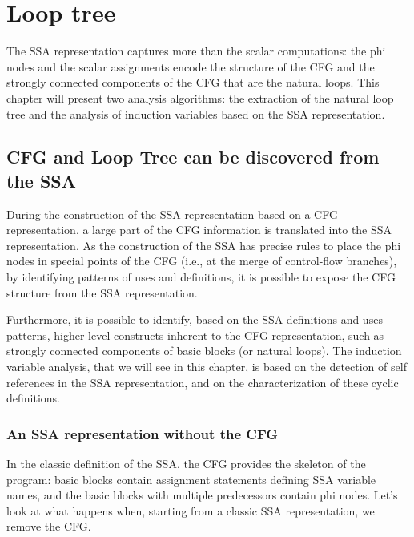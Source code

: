 \chapter{Loop tree }
\graphicspath{{fig/}{loop_tree/fig/}{part3/loop_tree/fig/}}


\providecommand{\SSA}{SSA}
\providecommand{\CFG}{CFG}
\providecommand{\loopphi}{loop-$\phi$}
\providecommand{\closephi}{close-$\phi$}
\providecommand{\CHREC}[1]{\{#1\}}

The \SSA{} representation captures more than the scalar computations: the
phi nodes and the scalar assignments encode the structure of the CFG
and the strongly connected components of the CFG that are the natural
loops.  This chapter will present two analysis algorithms: the
extraction of the natural loop tree and the analysis of induction
variables based on the \SSA{} representation.

\section{\CFG{} and Loop Tree can be discovered from the \SSA{}}

During the construction of the \SSA{} representation based on a \CFG{}
representation, a large part of the \CFG{} information is translated
into the \SSA{} representation.  As the construction of the \SSA{} has
precise rules to place the phi nodes in special points of the \CFG{}
(i.e., at the merge of control-flow branches), by identifying patterns
of uses and definitions, it is possible to expose the \CFG{} structure
from the \SSA{} representation.

Furthermore, it is possible to identify, based on the \SSA{}
definitions and uses patterns, higher level constructs inherent to the
\CFG{} representation, such as strongly connected components of basic
blocks (or natural loops).  The induction variable analysis, that we
will see in this chapter, is based on the detection of self references
in the \SSA{} representation, and on the characterization of these
cyclic definitions.

\subsection{An \SSA{} representation without the \CFG{}}

In the classic definition of the \SSA{}, the \CFG{} provides the
skeleton of the program: basic blocks contain assignment statements
defining \SSA{} variable names, and the basic blocks with multiple
predecessors contain phi nodes.  Let's look at what happens when,
starting from a classic \SSA{} representation, we remove the \CFG{}.

